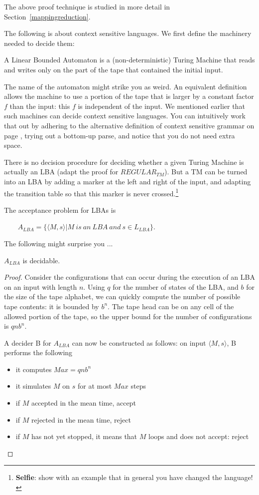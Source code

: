 The above proof technique is studied in more detail in
Section~\ref{mappingreduction}.



The following is about context sensitive languages. We first define
the machinery needed to decide them:

\begin{definition}
A Linear Bounded Automaton is a (non-deterministic) Turing Machine
that reads and writes only on the part of the tape that contained the
initial input.
\end{definition}

The name of the automaton might strike you as weird. An equivalent
definition allows the machine to use a portion of the tape that is
larger by a constant factor $f$ than the input: this $f$ is
independent of the input. We mentioned earlier that such machines can
decide context sensitive languages. You can intuitively work that out
by adhering to the alternative definition of context sensitive grammar
on page \pageref{altdefcs}, trying out a bottom-up parse, and notice
that you do not need extra space.

There is no decision procedure for deciding whether a given Turing
Machine is actually an LBA (adapt the proof for $REGULAR_{TM}$). But a
TM can be turned into an LBA by adding a marker at the left and right
of the input, and adapting the transition table so that this marker is
never crossed.\footnote{{\bf Selfie}: show with an example that in
  general you have changed the language!}


The acceptance problem for LBAs is

$~~~~~~~~~A_{LBA} = \{\langle M,s \rangle | M~is~an~LBA~and~s \in L_{LBA}\}$.

The following might surprise you ...

\begin{theorem}
$A_{LBA}$ is decidable.
\end{theorem}
\begin{proof}
Consider the configurations that can occur during the execution of
an LBA on an input with length $n$. Using $q$ for the number of states
of the LBA, and $b$ for the size of the tape alphabet, we can quickly
compute the number of possible tape contents: it is bounded by
$b^n$. The tape head can be on any cell of the allowed portion of the
tape, so the upper bound for the number of configurations is $qnb^n$.

A decider B for $A_{LBA}$ can now be constructed as follows:
on input $\langle M,s \rangle$, B performs the following
\begin{itemize}
\item it computes $Max = qnb^n$
\item it simulates $M$ on $s$ for at most $Max$ steps
\item if $M$ accepted in the mean time, accept
\item if $M$ rejected in the mean time, reject
\item if $M$ has not yet stopped, it means that $M$ loops and does not
  accept: reject
\end{itemize}
\end{proof}

